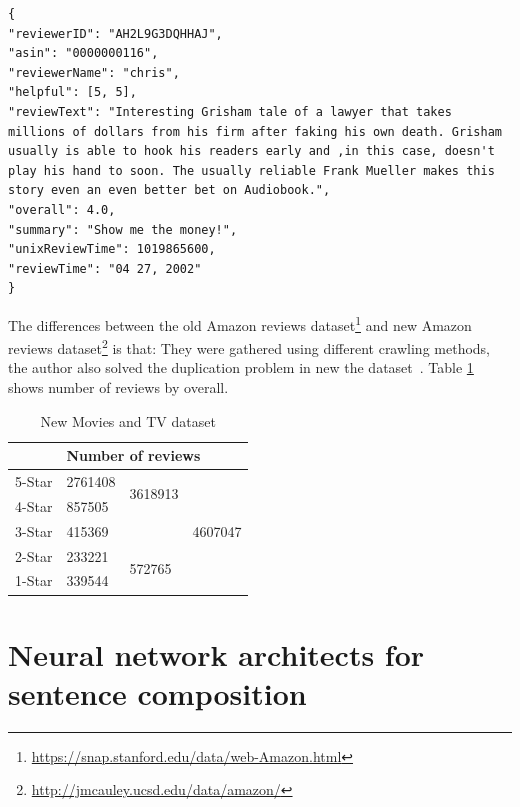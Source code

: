 \begin{lstlisting}[caption={Old Amazon reviews sample},label={lst:oldamzreview}]
{
"reviewerID": "AH2L9G3DQHHAJ",
"asin": "0000000116",
"reviewerName": "chris",
"helpful": [5, 5],
"reviewText": "Interesting Grisham tale of a lawyer that takes millions of dollars from his firm after faking his own death. Grisham usually is able to hook his readers early and ,in this case, doesn't play his hand to soon. The usually reliable Frank Mueller makes this story even an even better bet on Audiobook.",
"overall": 4.0,
"summary": "Show me the money!",
"unixReviewTime": 1019865600,
"reviewTime": "04 27, 2002"
}
\end{lstlisting}

The differences between the old Amazon reviews dataset\footnote{\url{https://snap.stanford.edu/data/web-Amazon.html}} and new Amazon reviews dataset\footnote{\url{http://jmcauley.ucsd.edu/data/amazon/}} is that:
They were gathered using different crawling methods, the author also solved the duplication problem in new the dataset~\cite{amazon-reviews}.
Table \ref{table:moviereview} shows number of reviews by overall.

\begin{table}[H]
    \centering
    \caption{New Movies and TV dataset}
    \label{table:moviereview}
    \begin{tabular}{@{}lllc@{}}
        \toprule
        & \multicolumn{3}{l}{Number of reviews}                         \\ \midrule
        5-Star & 2761408 & \multirow{2}{*}{3618913} & \multirow{5}{*}{4607047} \\ \cmidrule(r){1-2}
        4-Star & 857505  &                          &                          \\ \cmidrule(r){1-3}
        3-Star & \multicolumn{2}{l}{415369}         &                          \\ \cmidrule(r){1-3}
        2-Star & 233221  & \multirow{2}{*}{572765}  &                          \\ \cmidrule(r){1-2}
        1-Star & 339544  &                          &                          \\ \bottomrule
    \end{tabular}
\end{table}


\section{Neural network architects for sentence composition}\label{sec:composer}
